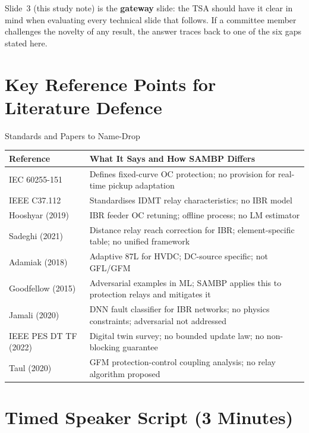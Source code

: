 \documentclass[12pt,a4paper]{article}
\begin{document}
Slide~3 (this study note) is the \textbf{gateway} slide: the TSA should have it
clear in mind when evaluating every technical slide that follows.  If a committee
member challenges the novelty of any result, the answer traces back to one of the
six gaps stated here.

\section{Key Reference Points for Literature Defence}

\begin{formulabox}{Standards and Papers to Name-Drop}
\begin{center}
\small
\begin{tabular}{@{}lp{9cm}@{}}
\toprule
\textbf{Reference} & \textbf{What It Says and How SAMBP Differs} \\
\midrule
IEC 60255-151       & Defines fixed-curve OC protection; no provision for real-time pickup adaptation \\
IEEE C37.112        & Standardises IDMT relay characteristics; no IBR model \\
Hooshyar (2019)     & IBR feeder OC retuning; offline process; no LM estimator \\
Sadeghi (2021)      & Distance relay reach correction for IBR; element-specific table; no unified framework \\
Adamiak (2018)      & Adaptive 87L for HVDC; DC-source specific; not GFL/GFM \\
Goodfellow (2015)   & Adversarial examples in ML; SAMBP applies this to protection relays and mitigates it \\
Jamali (2020)       & DNN fault classifier for IBR networks; no physics constraints; adversarial not addressed \\
IEEE PES DT TF (2022) & Digital twin survey; no bounded update law; no non-blocking guarantee \\
Taul (2020)         & GFM protection-control coupling analysis; no relay algorithm proposed \\
\bottomrule
\end{tabular}
\end{center}
\end{formulabox}

\section{Timed Speaker Script (3 Minutes)}
\end{document}
